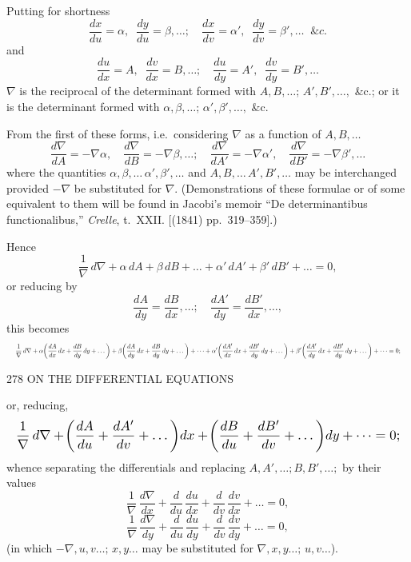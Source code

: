 \documentclass[11pt]{article}
\begin{document}
Putting for shortness
\[
  \frac{dx}{du} = \alpha,\;\; \frac{dy}{du} = \beta, \dots;\quad \frac{dx}{dv} = \alpha',\;\; \frac{dy}{dv} = \beta',\dots\;\; \&c.
\]
and
\[
  \frac{du}{dx} = A,\;\; \frac{dv}{dx} = B,\dots;\quad \frac{du}{dy} = A',\;\; \frac{dv}{dy} = B',\dots
\]
$\nabla$ is the reciprocal of the determinant formed with $A, B, \dots;\, A', B', \dots,$ \&c.; or it is the determinant formed with $\alpha, \beta, \dots;\, \alpha', \beta', \dots,$ \&c.

From the first of these forms, i.e.\ considering $\nabla$ as a function of $A, B, \dots$
\[
  \frac{d\nabla}{dA} = -\nabla \alpha,\quad \frac{d\nabla}{dB} = -\nabla \beta, \dots;\quad \frac{d\nabla}{dA'} = -\nabla \alpha',\quad \frac{d\nabla}{dB'} = -\nabla \beta', \dots
\]
where the quantities $\alpha, \beta, \dots\,\alpha', \beta', \dots$ and $A, B, \dots\,A', B', \dots$ may be interchanged provided $-\nabla$ be substituted for $\nabla$. (Demonstrations of these formulae or of some equivalent to them will be found in Jacobi's memoir ``De determinantibus functionalibus,'' \textit{Crelle}, t.~XXII. [(1841) pp.~319--359].)

Hence
\[
  \frac{1}{\nabla}\,d\nabla + \alpha\,dA + \beta\,dB + \dots + \alpha'\,dA' + \beta'\,dB' + \dots = 0,
\]
or reducing by
\[
  \frac{dA}{dy} = \frac{dB}{dx},\dots;\quad \frac{dA'}{dy} = \frac{dB'}{dx},\dots,
\]
this becomes
\[
  \resizebox{\textwidth}{!}{$\displaystyle
  \frac{1}{\nabla}\,d\nabla + \alpha\!\left(\frac{dA}{dx}\,dx + \frac{dB}{dy}\,dy + \dots\right) + \beta\!\left(\frac{dA}{dy}\,dx + \frac{dB}{dy}\,dy + \dots\right) + \dots
                          + \alpha'\!\left(\frac{dA'}{dx}\,dx + \frac{dB'}{dy}\,dy + \dots\right) + \beta'\!\left(\frac{dA'}{dy}\,dx + \frac{dB'}{dy}\,dy + \dots\right) + \dots = 0;
  $}
\]

\vspace{2em}

\begin{center}\small 278 \quad ON THE DIFFERENTIAL EQUATIONS \quad [43]\end{center}

\noindent or, reducing,
\[
  \resizebox{\textwidth}{!}{$\displaystyle
  \frac{1}{\nabla}\,d\nabla + \!\left(\frac{dA}{du} + \frac{dA'}{dv} + \dots\right)\!dx + \!\left(\frac{dB}{du} + \frac{dB'}{dv} + \dots\right)\!dy + \dots = 0;
  $}
\]
whence separating the differentials and replacing $A, A', \dots; B, B', \dots;$ by their values
\[
  \frac{1}{\nabla}\,\frac{d\nabla}{dx} + \frac{d}{du}\,\frac{du}{dx} + \frac{d}{dv}\,\frac{dv}{dx} + \dots = 0,
\]
\[
  \frac{1}{\nabla}\,\frac{d\nabla}{dy} + \frac{d}{du}\,\frac{du}{dy} + \frac{d}{dv}\,\frac{dv}{dy} + \dots = 0,
\]
(in which $-\nabla, u, v\dots;\, x, y\dots$ may be substituted for $\nabla, x, y\dots;\, u, v\dots$).
\end{document}
